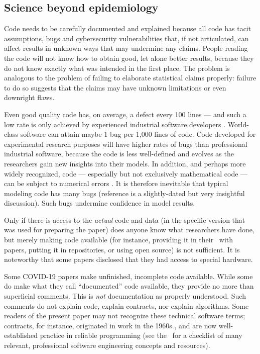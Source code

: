 \subsection{Science beyond epidemiology}
Code needs to be carefully documented and explained because all code has tacit assumptions, bugs and cybersecurity vulnerabilities \cite{Ben} that, if not articulated, can affect results in unknown ways that may undermine any claims. People reading the code will not know how to obtain good, let alone better results, because they do not know exactly what was intended in the first place. The problem is analogous to the problem of failing to elaborate statistical claims properly: failure to do so suggests that the claims may have unknown limitations or even downright flaws.

Even good quality code has, on average, a defect every 100 lines --- and {such a low} rate is only achieved by experienced industrial software developers \cite{ourReview}. World-class software can attain maybe 1 bug per 1,000 lines of code. Code developed for experimental research purposes will have higher rates of bugs than professional industrial software, because the code is less well-defined and evolves as the researchers gain new insights into their models. In addition, and perhaps more widely recognized, code --- especially but not exclusively mathematical code --- can be subject to numerical errors \cite{hamming}. It is therefore inevitable that typical modeling code has many bugs (reference \cite{NVP} is a slightly-dated but very insightful discussion). Such bugs undermine confidence in model results. 

Only if there is access to the \emph{actual\/} code and data (in the specific version that was used for preparing the paper) does anyone know what researchers have done, but merely making code available (for instance, providing it in their \supplement\ with papers, putting it in repositories, or using open source) is not sufficient. It is noteworthy that some papers disclosed that they had access to special hardware.

Some COVID-19 papers  make unfinished, incomplete code available. While some  do make what they call ``documented'' code available, they provide no more than superficial comments. This is \emph{not\/} documentation as properly understood. Such comments do not explain code, explain contracts, nor explain algorithms. Some readers of the present paper may not recognize these technical software terms; contracts, for instance, originated in work in the 1960s \cite{hoare}, and are now well-established practice in reliable programming {(see the \supplement\ for a checklist of many relevant, professional software engineering concepts and resources)}.

